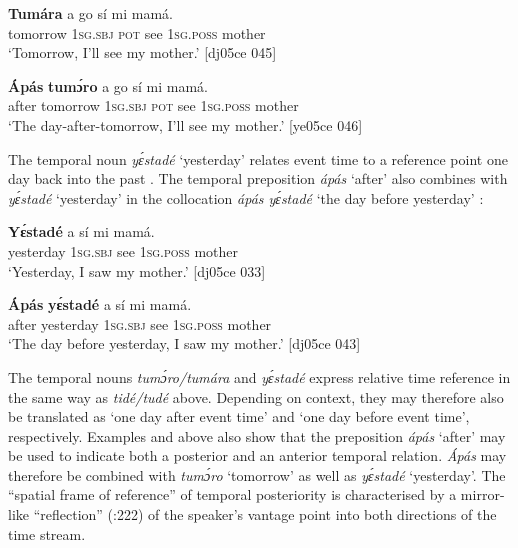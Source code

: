 \ea%
    \label{ex:key:1010}
    \gll \textbf{Tumára}    a    go  sí  mi    mamá.\\
tomorrow  \textsc{1sg.sbj}  \textsc{pot}  see  \textsc{1sg.poss}  mother\\

\glt ‘Tomorrow, I’ll see my mother.’ [dj05ce 045] 
\z


\ea%
    \label{ex:key:1011}
    \gll \textbf{\'{A}pás}  \textbf{tumɔ́ro}    a    go  sí  mi    mamá.\\
after  tomorrow  \textsc{1sg.sbj}  \textsc{pot}  see  \textsc{1sg.poss}  mother\\

\glt ‘The day-after-tomorrow, I’ll see my mother.’ [ye05ce 046]
\z

The temporal noun \textit{yɛ́stadé} ‘yesterday’ relates event time to a reference point one day back into the past . The temporal preposition \textit{ápás} ‘after’ also combines with \textit{yɛ́stadé} ‘yesterday’ in the collocation \textit{ápás yɛ́stadé} ‘the day before yesterday’ : 


\ea%
    \label{ex:key:1012}
    \gll \textbf{Yɛ́stadé}    a    sí  mi    mamá.\\
yesterday  \textsc{1sg.sbj}  see  \textsc{1sg.poss}  mother\\

\glt ‘Yesterday, I saw my mother.’ [dj05ce 033]
\z


\ea%
    \label{ex:key:1013}
    \gll \textbf{\'{A}pás}  \textbf{yɛ́stadé}    a    sí  mi    mamá.\\
after  yesterday  \textsc{1sg.sbj}  see  \textsc{1sg.poss}  mother\\

\glt ‘The day before yesterday, I saw my mother.’ [dj05ce 043]
\z

The temporal nouns \textit{tumɔ́ro/tumára} and \textit{yɛ́stadé} express relative time reference in the same way as \textit{tidé/tudé} above. Depending on context, they may therefore also be translated as ‘one day after event time’ and ‘one day before event time’, respectively. Examples  and  above also show that the preposition \textit{ápás} ‘after’ may be used to indicate both a posterior and an anterior temporal relation. \textit{\'{A}pás} may therefore be combined with \textit{tumɔ́ro} ‘tomorrow’ as well as \textit{yɛ́stadé} ‘yesterday’. The “spatial frame of reference” \citep[24]{Levinson2003} of temporal posteriority is characterised by a mirror-like “reflection” (\citealt{BenderBannardo2005}:222) of the speaker’s vantage point into both directions of the time stream.{\fff}


